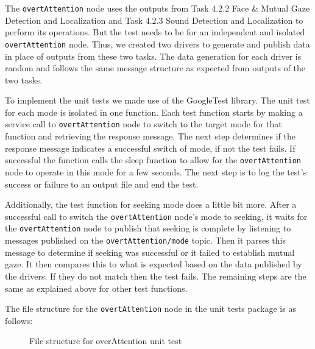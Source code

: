 \documentclass{CSSRforAfrica}
\begin{document}
The \texttt{overtAttention} node uses the outputs from Task 4.2.2 Face \& Mutual Gaze Detection and Localization and Task 4.2.3 Sound Detection and Localization to perform its operations. But the test needs to be for an independent and isolated \texttt{overtAttention} node. Thus, we created two drivers to generate and publish data in place of outputs from these two tasks. The data generation for each driver is random and follows the same message structure as expected from outputs of the two tasks.

To implement the unit tests we made use of the GoogleTest library. The unit test for each mode is isolated in one function. Each test function starts by making a service call to \texttt{overtAttention} node to switch to the target mode for that function and retrieving the response message. The next step determines if the response message indicates a successful switch of mode, if not the test fails. If successful the function calls the sleep function to allow for the \texttt{overtAttention} node to operate in this mode for a few seconds. The next step is to log the test's success or failure to an output file and end the test. 

Additionally, the test function for seeking mode does a little bit more. After a successful call to switch the \texttt{overtAttention} node's mode to seeking, it waits for the \texttt{overtAttention} node to publish that seeking is complete by listening to messages published on the \texttt{overtAttention/mode} topic. Then it parses this message to determine if seeking was successful or it failed to establish mutual gaze. It then compares this to what is expected based on the data published by the drivers. If they do not match then the test fails. The remaining steps are the same as explained above for other test functions.

\newpage
The file structure for the \texttt{overtAttention} node in the unit tests package is as follows:

\begin{figure}[h!]
	\renewcommand*\DTstyle{\ttfamily}
	\caption{File structure for overAttention unit test}
\end{figure}
\vspace{0.5cm}
\end{document}
